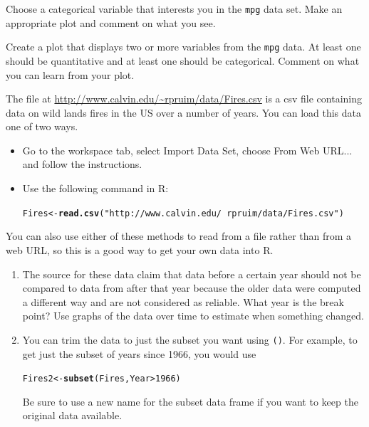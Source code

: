 \documentclass[twoside]{book}\usepackage[]{graphicx}\usepackage[]{xcolor}
\makeatletter
\newcommand{\hlnum}[1]{\textcolor[rgb]{0.686,0.059,0.569}{#1}}%
\newcommand{\hlstr}[1]{\textcolor[rgb]{0.192,0.494,0.8}{#1}}%
\newcommand{\hlopt}[1]{\textcolor[rgb]{0,0,0}{#1}}%
\newcommand{\hlstd}[1]{\textcolor[rgb]{0.345,0.345,0.345}{#1}}%
\newcommand{\hlkwb}[1]{\textcolor[rgb]{0.69,0.353,0.396}{#1}}%
\newcommand{\hlkwd}[1]{\textcolor[rgb]{0.737,0.353,0.396}{\textbf{#1}}}%
\newenvironment{kframe}{%
 \def\at@end@of@kframe{}%
 \ifinner\ifhmode%
  \def\at@end@of@kframe{\end{minipage}}%
  \begin{minipage}{\columnwidth}%
 \fi\fi%
 \def\FrameCommand##1{\hskip\@totalleftmargin \hskip-\fboxsep
 \colorbox{shadecolor}{##1}\hskip-\fboxsep
     \hskip-\linewidth \hskip-\@totalleftmargin \hskip\columnwidth}%
 \MakeFramed {\advance\hsize-\width
   \@totalleftmargin\z@ \linewidth\hsize
   \@setminipage}}%
 {\par\unskip\endMakeFramed%
 \at@end@of@kframe}
\newenvironment{knitrout}{}{} %
\newcommand{\Rindex}[1]{\index{\texttt{#1}}}
\newcommand{\dataframe}[1]{{\color{blue!80!black}\texttt{#1}}\Rindex{#1}}
\newcommand{\function}[1]{{\color{purple!75!blue}\texttt{\StrSubstitute{#1}{()}{}()}}\Rindex{#1}}
\def\R{{\sf R}}
\def\tab#1{{\sf #1}}
\newcounter{example}[section]
\makeatother
\begin{document}
\begin{problem}
	Choose a categorical variable that interests you in the \dataframe{mpg}
	data set.  Make an appropriate plot and comment on what you see.
\end{problem}

\begin{problem}
	Create a plot that displays two or more variables from the 
	\dataframe{mpg} data.  At least one should be quantitative 
	and at least one should be categorical.
	Comment on what you can learn from your plot.
\end{problem}

\begin{problem}The file at \url{http://www.calvin.edu/~rpruim/data/Fires.csv}
	is a csv file containing data on wild lands fires in the US over a number of years.
You can load this data one of two ways.
\begin{itemize}
	\item
		Go to the workspace tab, select \tab{Import Data Set}, choose \tab{From Web URL...}
		and follow the instructions.
	\item
		Use the following command in \R:
\begin{knitrout}
\color{fgcolor}\begin{kframe}
\begin{alltt}
\hlstd{Fires} \hlkwb{<-} \hlkwd{read.csv}\hlstd{(}\hlstr{"http://www.calvin.edu/~rpruim/data/Fires.csv"}\hlstd{)}
\end{alltt}
\end{kframe}
\end{knitrout}
\end{itemize}
You can also use either of these methods to read from a file rather than from a
web URL, so this is a good way to get your own data into \R.
\begin{enumerate}
	\item
		The source for these data claim that data before a certain year should not be compared
		to data from after that year because the older data were computed a different way and
		are not considered as reliable.  What year is the break point?  Use graphs of the data 
		over time to estimate when something changed.
	\item
		You can trim the data to just the subset you want using \function{subset()}.  For 
		example, to get just the subset of years since 1966, you would use
\begin{knitrout}
\color{fgcolor}\begin{kframe}
\begin{alltt}
\hlstd{Fires2} \hlkwb{<-} \hlkwd{subset}\hlstd{(Fires, Year} \hlopt{>} \hlnum{1966}\hlstd{)}
\end{alltt}
\end{kframe}
\end{knitrout}
		Be sure to use a new name for the subset data frame if you want to keep the original data available.


\end{enumerate}
\end{problem}
\end{document}
